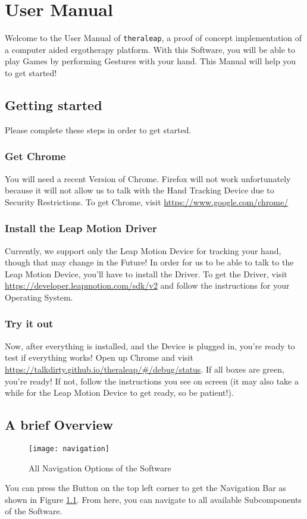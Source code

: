 \chapter{User Manual}
Welcome to the User Manual of \texttt{theraleap}, a proof of concept implementation of a computer aided ergotherapy platform. With this Software, you will be able to play Games by performing Gestures with your hand. This Manual will help you to get started!
\section{Getting started}
Please complete these steps in order to get started.
\subsection{Get Chrome}
You will need a recent Version of Chrome. Firefox will not work unfortunately because it will not allow us to talk with the Hand Tracking Device due to Security Restrictions. To get Chrome, visit \url{https://www.google.com/chrome/}
\subsection{Install the Leap Motion Driver}
Currently, we support only the Leap Motion Device for tracking your hand, though that may change in the Future! In order for us to be able to talk to the Leap Motion Device, you'll have to install the Driver. To get the Driver, visit \url{https://developer.leapmotion.com/sdk/v2} and follow the instructions for your Operating System.
\subsection{Try it out}
Now, after everything is installed, and the Device is plugged in, you're ready to test if everything works! Open up Chrome and visit \url{https://talkdirty.github.io/theraleap/#/debug/status}. If all boxes are green, you're ready! If not, follow the instructions you see on screen (it may also take a while for the Leap Motion Device to get ready, so be patient!).

\section{A brief Overview}
\begin{figure}[h]
    \centering
    \texttt{[image: navigation]}
    \caption{All Navigation Options of the Software}
    \label{fig:navigation}
\end{figure}
You can press the Button on the top left corner to get the Navigation Bar as shown in Figure \ref{fig:navigation}. From here, you can navigate to all available Subcomponents of the Software.

